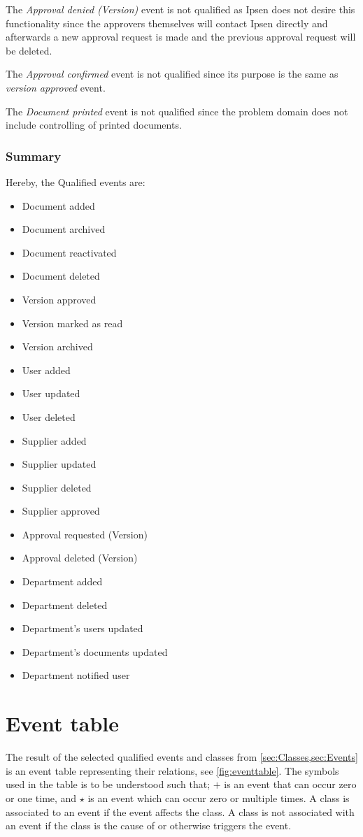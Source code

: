 The \textit{Approval denied (Version)} event is not qualified as Ipsen does not desire this functionality since the approvers themselves will contact Ipsen directly and afterwards a new approval request is made and the previous approval request will be deleted.

The \textit{Approval confirmed} event is not qualified since its purpose is the same as \textit{version approved} event.

The \textit{Document printed} event is not qualified since the problem domain does not include controlling of printed documents.

\subsubsection*{Summary}
Hereby, the Qualified events are:
\begin{multicols}{2}
	\begin{itemize}
	\item Document added
	\item Document archived
	\item Document reactivated
	\item Document deleted
	\item Version approved
	\item Version marked as read
	\item Version archived
	\item User added
	\item User updated
	\item User deleted
	\item Supplier added
	\item Supplier updated
	\item Supplier deleted
	\item Supplier approved
	\item Approval requested (Version)
	\item Approval deleted (Version)
	\item Department added
	\item Department deleted
	\item Department's users updated
	\item Department's documents updated
	\item Department notified user
	\end{itemize}
\end{multicols}

\section{Event table}\label{sec:EventTable}
The result of the selected qualified events and classes from \cref{sec:Classes,sec:Events} is an event table representing their relations, see \cref{fig:eventtable}.
The symbols used in the table is to be understood such that; $+$ is an event that can occur zero or one time, and $\star$ is an event which can occur zero or multiple times.
A class is associated to an event if the event affects the class.
A class is not associated with an event if the class is the cause of or otherwise triggers the event.

